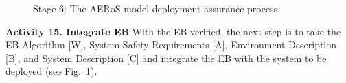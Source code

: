 \documentclass[runningheads]{llncs}
\begin{document}
\begin{figure}[!t]
\begin{minipage}[b]{.5\textwidth}
			\vspace{-2ex}
			\caption{Stage 6: The AERoS model \newline deployment assurance process.}
			\label{amlas-a-stage6}
		\end{minipage}
	\vspace{-4ex}
\end{figure}
\noindent\textbf{Activity 15. Integrate EB} With the EB verified, the next step is to take the EB Algorithm [W], System Safety Requirements [A], Environment Description [B], and System Description [C] and integrate the EB with the system to be deployed (see Fig.~\ref{amlas-a-stage6}). 
\end{document}
